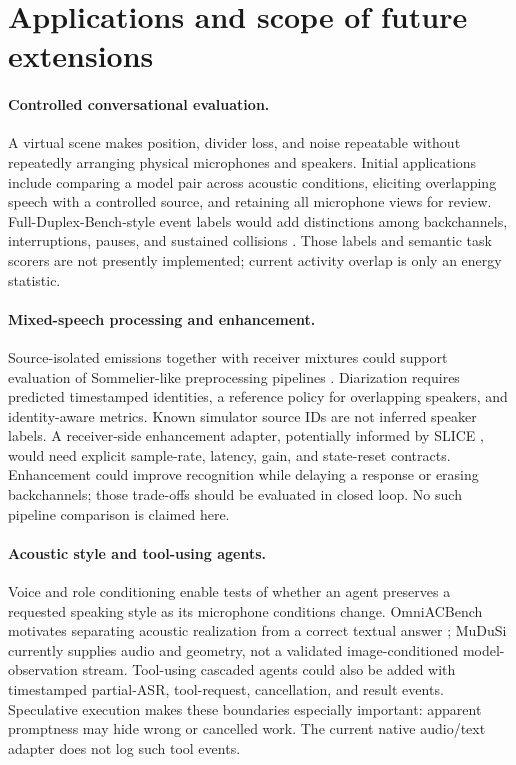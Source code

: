 \documentclass{article}
\begin{document}
\section{Applications and scope of future extensions}
\label{sec:applications}
\paragraph{Controlled conversational evaluation.} A virtual scene makes position, divider loss, and noise repeatable without repeatedly arranging physical microphones and speakers. Initial applications include comparing a model pair across acoustic conditions, eliciting overlapping speech with a controlled source, and retaining all microphone views for review. Full-Duplex-Bench-style event labels would add distinctions among backchannels, interruptions, pauses, and sustained collisions \citep{lin2025fullduplexbench,lin2025overlap}. Those labels and semantic task scorers are not presently implemented; current activity overlap is only an energy statistic.

\paragraph{Mixed-speech processing and enhancement.} Source-isolated emissions together with receiver mixtures could support evaluation of Sommelier-like preprocessing pipelines \citep{jung2026sommelier}. Diarization requires predicted timestamped identities, a reference policy for overlapping speakers, and identity-aware metrics. Known simulator source IDs are not inferred speaker labels. A receiver-side enhancement adapter, potentially informed by SLICE \citep{moon2026slice}, would need explicit sample-rate, latency, gain, and state-reset contracts. Enhancement could improve recognition while delaying a response or erasing backchannels; those trade-offs should be evaluated in closed loop. No such pipeline comparison is claimed here.

\paragraph{Acoustic style and tool-using agents.} Voice and role conditioning enable tests of whether an agent preserves a requested speaking style as its microphone conditions change. OmniACBench motivates separating acoustic realization from a correct textual answer \citep{kim2026omniacbench}; MuDuSi currently supplies audio and geometry, not a validated image-conditioned model-observation stream. Tool-using cascaded agents could also be added with timestamped partial-ASR, tool-request, cancellation, and result events. Speculative execution \citep{jung2026speculative} makes these boundaries especially important: apparent promptness may hide wrong or cancelled work. The current native audio/text adapter does not log such tool events.
\end{document}
